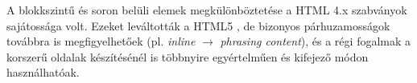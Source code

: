 \begin{frame}
  A blokkszintű és soron belüli elemek megkülönböztetése a HTML 4.x szabványok sajátossága volt. Ezeket leváltották a HTML5 , de bizonyos párhuzamosságok továbbra is megfigyelhetőek (pl. \emph{inline} $\to$ \emph{phrasing content}), és a régi fogalmak a korszerű oldalak készítésénél is többnyire egyértelműen és kifejező módon használhatóak. 
\end{frame}
